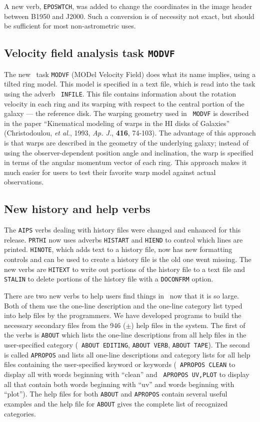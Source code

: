 A new verb, {\tt EPOSWTCH}, was added to change the coordinates in the
image header between B1950 and J2000.  Such a conversion is of
necessity not exact, but should be sufficient for most non-astrometric
uses.

\eject
\subsection{Velocity field analysis task {\tt MODVF}}

The new \AIPS\ task {\tt MODVF} (MODel Velocity Field) does what its
name implies, using a tilted ring model.  This model is specified in a
text file, which is read into the task using the adverb \hbox{{\tt
INFILE}}.  This file contains information about the rotation velocity
in each ring and its warping with respect to the central portion of
the galaxy --- the reference disk.  The warping geometry used in {\tt
MODVF} is described in the paper ``Kinematical modeling of warps in
the HI disks of Galaxies'' (Christodoulou, {\it et al.\/}, 1993, {\it
Ap. J.\/}, {\bf 416}, 74-103).  The advantage of this approach is that
warps are described in the geometry of the underlying galaxy; instead
of using the observer-dependent position angle and inclination, the
warp is specified in terms of the angular momentum vector of each
ring.  This approach makes it much easier for users to test their
favorite warp model against actual observations.


\subsection{New history and help verbs}

The {\tt AIPS} verbs dealing with history files were changed and
enhanced for this release.  {\tt PRTHI} now uses adverbs {\tt HISTART}
and {\tt HIEND} to control which lines are printed.  {\tt HINOTE},
which adds text to a history file, now has new formatting controls and
can be used to create a history file is the old one went missing.  The
new verbs are {\tt HITEXT} to write out portions of the history file
to a text file and {\tt STALIN} to delete portions of the history
file with a {\tt DOCONFRM} option.

There are two new verbs to help users find things in \AIPS\ now that
it is so large.  Both of them use the one-line description and the
one-line category list typed into help files by the programmers.  We
have developed programs to build the necessary secondary files from
the 946 ($\pm$) help files in the system.  The first of the verbs is
{\tt ABOUT} which lists the one-line descriptions from all help files
in the user-specified category (\eg\ {\tt ABOUT EDITING}, {\tt ABOUT
VERB}, {\tt ABOUT TAPE}).  The second is called {\tt APROPOS} and
lists all one-line descriptions and category lists for all help files
containing the user-specified keyword or keywords (\eg\ {\tt APROPOS
CLEAN} to display all with words beginning with ``clean'' and {\tt
APROPOS UV,PLOT} to display all that contain both words beginning with
``uv'' and words beginning with ``plot'').  The help files for both
{\tt ABOUT} and {\tt APROPOS} contain several useful examples and the
help file for {\tt ABOUT} gives the complete list of recognized
categories.

